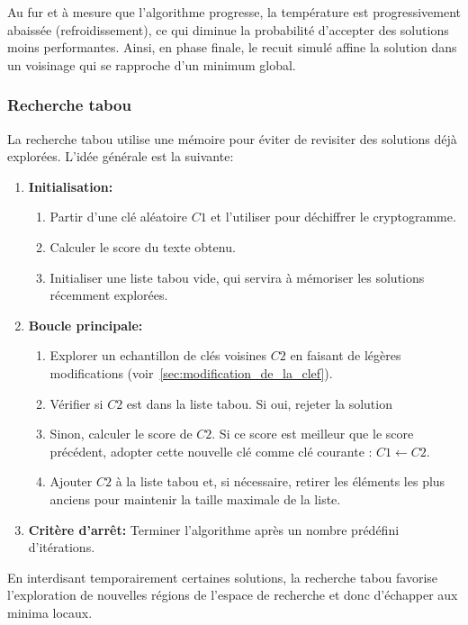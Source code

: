 \documentclass[a4paper]{article}
\begin{document}
Au fur et à mesure que l'algorithme progresse, la température est progressivement abaissée (refroidissement), ce qui diminue la probabilité d'accepter des solutions moins performantes. Ainsi, en phase finale, le recuit simulé affine la solution dans un voisinage qui se rapproche d'un minimum global.

\subsubsection{Recherche tabou}

La recherche tabou utilise une mémoire pour éviter de revisiter des solutions déjà explorées. L'idée générale est la suivante:

\begin{enumerate}
    \item \textbf{Initialisation:}
    \begin{enumerate}
        \item Partir d'une clé aléatoire $C1$ et l'utiliser pour déchiffrer le cryptogramme.
        \item Calculer le score du texte obtenu.
        \item Initialiser une liste tabou vide, qui servira à mémoriser les solutions récemment explorées.
    \end{enumerate}
    \item \textbf{Boucle principale:}
    \begin{enumerate}[label= (\alph*)]
        \item Explorer un echantillon de clés voisines $C2$ en faisant de légères modifications (voir~\ref{sec:modification_de_la_clef}).
        \item Vérifier si $C2$ est dans la liste tabou. Si oui, rejeter la solution
        \item Sinon, calculer le score de $C2$. Si ce score est meilleur que le score précédent, adopter cette nouvelle clé comme clé courante : $C1 \leftarrow C2$.
        \item Ajouter $C2$ à la liste tabou et, si nécessaire, retirer les éléments les plus anciens pour maintenir la taille maximale de la liste.
    \end{enumerate}
    \item \textbf{Critère d'arrêt:} Terminer l'algorithme après un nombre prédéfini d'itérations.
\end{enumerate}


En interdisant temporairement certaines solutions, la recherche tabou favorise l'exploration de nouvelles régions de l'espace de recherche et donc d'échapper aux minima locaux.
\end{document}
